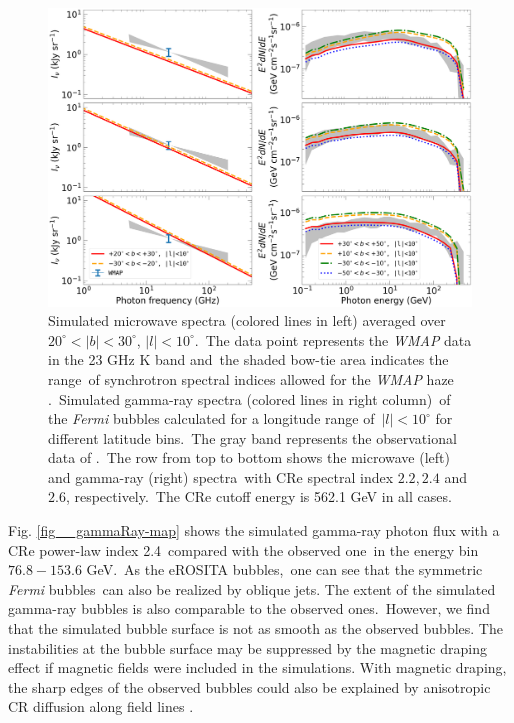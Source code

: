 \documentclass[fleqn,usenatbib,useAMS]{mnras}
\begin{document}
\begin{figure}
  \includegraphics[width=\linewidth]{figures/fig__spectrum.png}
  \caption{
      Simulated microwave spectra (colored lines in left) averaged over $20^{\circ}<|b|<30^{\circ}$, $|l|<10^{\circ}$.\
      The data point represents the \textit{WMAP} data in the 23 GHz K band and\
      the shaded bow-tie area indicates the range\
      of synchrotron spectral indices allowed for the \textit{WMAP} haze \citep{Dobler_2008}.\
      Simulated gamma-ray spectra (colored lines in right column)\
      of the \textit{Fermi} bubbles calculated for a longitude range of\
      $|l|<10^{\circ}$ for different latitude bins.\
      The gray band represents the observational data of \citet{Ackermann2014}.\
      The row from top to bottom shows the microwave (left) and gamma-ray (right) spectra\
      with CRe spectral index $2.2, 2.4$ and $2.6$, respectively.\
      The CRe cutoff energy is 562.1 GeV in all cases.
  }
  \label{fig__gammaRaySynchtronSpectrum}
\end{figure}

 Fig. \ref{fig__gammaRay-map} shows the simulated gamma-ray photon flux with a CRe power-law index 2.4\
 compared with the observed one\
 in the energy bin $76.8-153.6$ GeV.\
 As the eROSITA bubbles,\
 one can see that the symmetric \textit{Fermi} bubbles\
 can also be realized by oblique jets. The extent of the simulated gamma-ray bubbles is also comparable to the observed ones.\
 However, we find that the simulated bubble surface is not as smooth
 as the observed bubbles. The instabilities at the bubble
 surface may be suppressed by the magnetic draping
 effect \citep{Lyutikov2006,Yang2012} if magnetic fields were
 included in the simulations. With magnetic draping, the sharp edges of the observed bubbles \citep{Su2010, Ackermann2014} could also be explained by anisotropic CR diffusion along field lines \citep{Yang2013}.
\end{document}
